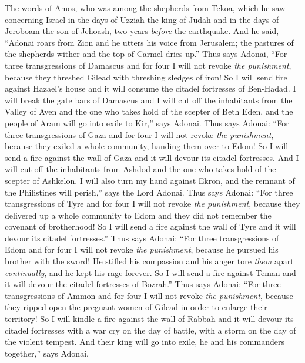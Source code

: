
\begin{biblechapter} %
 The words of Amos, who was among the shepherds from Tekoa, which he saw concerning Israel in the days of Uzziah the king of Judah and in the days of Jeroboam the son of Jehoash, two years \textit{before} the earthquake.
 And he said, “Adonai roars from Zion and he utters his voice from Jerusalem; the pastures of the shepherds wither and the top of Carmel dries up.”
\verse Thus says Adonai, “For three transgressions of Damascus and for four I will not revoke \textit{the punishment}, because they threshed Gilead with threshing sledges of iron!
\verse So I will send fire against Hazael’s house and it will consume the citadel fortresses of Ben-Hadad.
\verse I will break the gate bars of Damascus and I will cut off the inhabitants from the Valley of Aven and the one who takes hold of the scepter of Beth Eden, and the people of Aram will go into exile to Kir,” says Adonai.
\verse Thus says Adonai: “For three transgressions of Gaza and for four I will not revoke \textit{the punishment}, because they exiled a whole community, handing them over to Edom!
\verse So I will send a fire against the wall of Gaza and it will devour its citadel fortresses.
\verse And I will cut off the inhabitants from Ashdod and the one who takes hold of the scepter of Ashkelon. I will also turn my hand against Ekron, and the remnant of the Philistines will perish,” says the Lord Adonai.
\verse Thus says Adonai: “For three transgressions of Tyre and for four I will not revoke \textit{the punishment}, because they delivered up a whole community to Edom and they did not remember the covenant of brotherhood!
\verse So I will send a fire against the wall of Tyre and it will devour its citadel fortresses.”
\verse Thus says Adonai: “For three transgressions of Edom and for four I will not revoke \textit{the punishment}, because he pursued his brother with the sword! He stifled his compassion and his anger tore \textit{them} apart \textit{continually}, and he kept his rage forever.
\verse So I will send a fire against Teman and it will devour the citadel fortresses of Bozrah.”
\verse Thus says Adonai: “For three transgressions of Ammon and for four I will not revoke \textit{the punishment}, because they ripped open the pregnant women of Gilead in order to enlarge their territory!
\verse So I will kindle a fire against the wall of Rabbah and it will devour its citadel fortresses with a war cry on the day of battle, with a storm on the day of the violent tempest.
\verse And their king will go into exile, he and his commanders together,” says Adonai.
\end{biblechapter}

